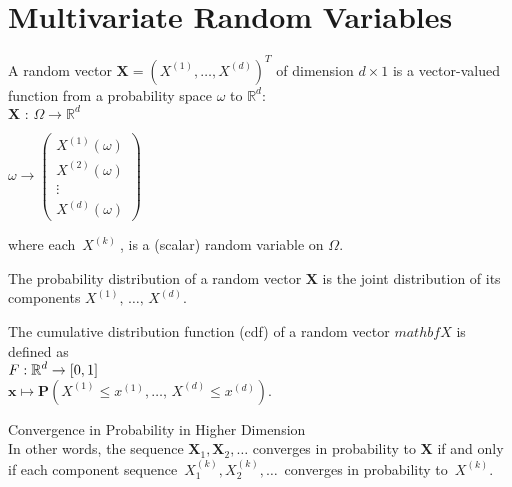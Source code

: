 \section{Multivariate Random Variables}


A random vector $\mathbf X= \left(X^{(1)},\dots ,X^{(d)}\right)^ T$ of dimension $d \times 1$ is a vector-valued function from a probability space $\omega$ to $\mathbb {R}^ d$:\\

$\displaystyle  \mathbf{X}\, \, :\,  \Omega \longrightarrow \displaystyle  \mathbb {R}^ d$

$\displaystyle \omega  \longrightarrow \displaystyle \begin{pmatrix}  X^{(1)}(\omega ) \\ X^{(2)}(\omega )\\ \vdots \\ X^{(d)}(\omega )\end{pmatrix}$

where each $\, X^{(k)}\ $, is a (scalar) random variable on $\Omega$. 

The probability distribution of a random vector $\mathbf X$ is the joint distribution of its components $X^{(1)},\, \ldots ,\, X^{(d)}$. 

The cumulative distribution function (cdf) of a random vector $mathbf X$ is defined as \\
$\displaystyle  \displaystyle F: \mathbb {R}^ d \rightarrow \displaystyle  [0,1]$\\

$\displaystyle \mathbf{x} \displaystyle \mapsto \displaystyle  \mathbf{P}(X^{(1)}\leq x^{(1)},\ldots ,\, X^{(d)}\leq x^{(d)}).$

Convergence in Probability in Higher Dimension\\

In other words, the sequence $\mathbf{X}_1, \mathbf{X}_2,\ldots$ converges in probability to $\mathbf{X}$ if and only if each component sequence $\, X_1^{(k)},X_2^{(k)},\ldots \,$ converges in probability to $\, X^{(k)}$.


